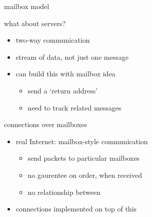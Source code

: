 \begin{frame}{mailbox model}
\end{frame}

\begin{frame}{what about servers?}
    \begin{itemize}
    \item two-way communication
    \item stream of data, not just one message
    \vspace{.5cm}
    \item<2-> can build this with mailbox idea
        \begin{itemize}
        \item send a `return address'
        \item need to track related messages
        \end{itemize}
    \end{itemize}
\end{frame}

\begin{frame}{connections over mailboxes}
    \begin{itemize}
    \item real Internet: mailbox-style communication
        \begin{itemize}
        \item send packets to particular mailboxes
        \item no gaurentee on order, when received
        \item no relationship between 
        \end{itemize}
    \item connections implemented on top of this
    \end{itemize}
\end{frame}


